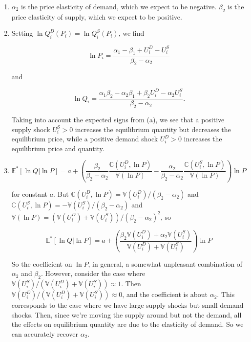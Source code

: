 \documentclass{article}
\begin{document}
\begin{enumerate}
	\begin{enumerate}

		\item

		$\alpha_2$ is the price elasticity of demand, which we expect to be negative. $\beta_2$ is the price elasticity of supply, which we expect to be positive.

		\item

		Setting $\ln Q_i^D(P_i) = \ln Q_i^S(P_i)$, we find

		$$\ln P_i = \frac{\alpha_1 - \beta_1 + U_i^D - U_i^S}{\beta_2 - \alpha_2} $$

		and

		$$\ln Q_i = \frac{\alpha_1 \beta_2 - \alpha_2 \beta_1 + \beta_2 U^D_i - \alpha_2 U^S_i}{\beta_2 - \alpha_2}.$$

		Taking into account the expected signs from (a), we see that a positive supply shock $U_i^S > 0$ increases the equilibrium quantity but decreases the equilibrium price, while a positive demand shock $U_i^D > 0$ increases the equilibrium price and quantity.

		\item

		$$\mathbb{E}^*[\ln Q | \ln P] = a + \left( \frac{\beta_2}{\beta_2 - \alpha_2} \frac{\mathbb{C}(U_i^D, \ln P)}{\mathbb{V}(\ln P)} - \frac{\alpha_2}{\beta_2 - \alpha_2} \frac{\mathbb{C}(U_i^S, \ln P)}{\mathbb{V}(\ln P)} \right) \ln P$$

		for constant $a$. But $\mathbb{C}(U_i^D, \ln P) = \mathbb{V}(U_i^D)/(\beta_2 - \alpha_2)$ and $\mathbb{C}(U_i^S, \ln P) = -\mathbb{V}(U_i^S)/(\beta_2 - \alpha_2)$ and $\mathbb{V} (\ln P) = (\mathbb{V}(U_i^D) + \mathbb{V}(U_i^S))/(\beta_2 - \alpha_2)^2$, so

		$$\mathbb{E}^*[\ln Q | \ln P] = a + \left( \frac{\beta_2 \mathbb{V}(U_i^D) + \alpha_2 \mathbb{V}(U_i^S)}{\mathbb{V}(U_i^D) + \mathbb{V}(U_i^S)} \right) \ln P$$

		So the coefficient on $\ln P$, in general, a somewhat unpleasant combination of $\alpha_2$ and $\beta_2$. However, consider the case where $\mathbb{V}(U_i^S) / (\mathbb{V}(U_i^D) + \mathbb{V}(U_i^S)) \approx 1$. Then $\mathbb{V}(U_i^D) / (\mathbb{V}(U_i^D) + \mathbb{V}(U_i^S)) \approx 0$, and the coefficient is about $\alpha_2$. This corresponds to the case where we have large supply shocks but small demand shocks. Then, since we're moving the supply around but not the demand, all the effects on equilibrium quantity are due to the elasticity of demand. So we can accurately recover $\alpha_2$.

	\end{enumerate}

\end{enumerate}
\end{document}
